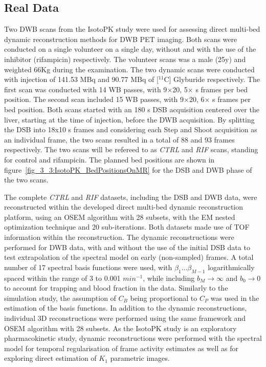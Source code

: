\subsection{Real Data}
Two DWB scans from the IsotoPK study were used for assessing direct multi-bed dynamic reconstruction methods for DWB PET imaging. Both scans were conducted on a single volunteer on a single day, without and with the use of the inhibitor (rifampicin) respectively. The volunteer scans was a male (25y) and weighted 66Kg during the examination. The two dynamic scans were conducted with injection of 141.53 MBq and 90.77 MBq of [$^{11}$C] Glyburide respectively. The first scan was conducted with 14 WB passes, with 9$\times$20, 5$\times$ s frames per bed position. The second scan included 15 WB passes, with 9$\times$20, 6$\times$ s frames per bed position. Both scans started with an 180 s DSB acquisition centered over the liver, starting at the time of injection, before the DWB acquisition. By splitting the DSB into 18x10 s frames and considering each Step and Shoot acquisition as an individual frame, the two scans resulted in a total of 88 and 93 frames respectively. 
The two scans will be refereed to as \textit{CTRL} and \textit{RIF} scans, standing for control and rifampicin. 
The planned bed positions are shown in figure~\ref{fig_3_3:IsotoPK_BedPositionsOnMR} for the DSB and DWB phase of the two scans. 

The complete \textit{CTRL} and \textit{RIF} datasets, including the DSB and DWB data, were reconstructed within the developed direct multi-bed dynamic reconstruction platform, using an OSEM algorithm with 28 subsets, with the EM nested optimization technique and 20 sub-iterations. Both datasets made use of TOF information within the reconstruction. The dynamic reconstructions were performed for DWB data, with and without the use of the initial DSB data to test extrapolation of the spectral model on early (non-sampled) frames. 
A total number of 17 spectral basis functions were used, with $\beta_1 ... \beta_{M-1}$ logarithmically spaced within the range of 3 to 0.001 $min^{-1}$, while including $b_M\xrightarrow{}\infty$ and $b_0\xrightarrow{}0$ to account for trapping and blood fraction in the data. Similarly to the simulation study, the assumption of $C_{B}$ being proportional to $C_{P}$ was used in the estimation of the basis functions.
In addition to the dynamic reconstructions, individual 3D reconstructions were performed using the same framework and OSEM algorithm with 28 subsets. As the IsotoPK study is an exploratory pharmacokinetic study, dynamic reconstructions were performed with the spectral model for temporal regularisation of frame activity estimates as well as for exploring direct estimation of $K_1$ parametric images. 

